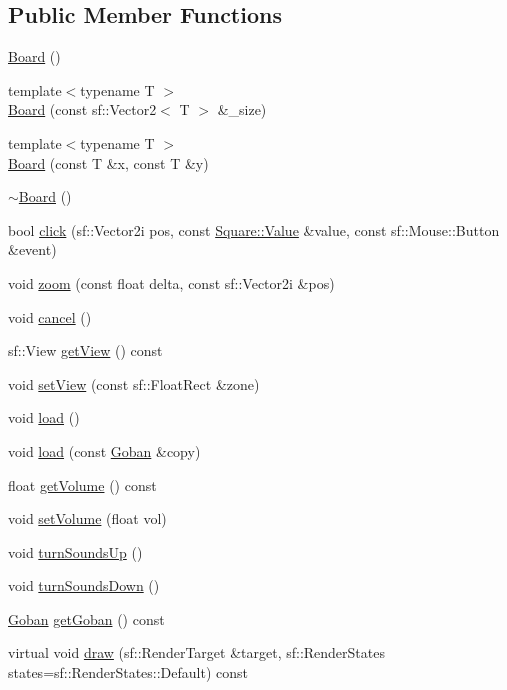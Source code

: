 \subsection*{Public Member Functions}
\begin{DoxyCompactItemize}
\item 
\hyperlink{class_board_a9ee491d4fea680cf69b033374a9fdfcb}{Board} ()
\item 
{\footnotesize template$<$typename T $>$ }\\\hyperlink{class_board_a3ab3bc5a15b6f8fb4aa8473fed2afdcb}{Board} (const sf\+::\+Vector2$<$ T $>$ \&\+\_\+size)
\item 
{\footnotesize template$<$typename T $>$ }\\\hyperlink{class_board_abda1ce2449776e76715fc7b59c912935}{Board} (const T \&x, const T \&y)
\item 
\hyperlink{class_board_af73f45730119a1fd8f6670f53f959e68}{$\sim$\+Board} ()
\item 
bool \hyperlink{class_board_a5fda73da080403d8a71a8593d581c350}{click} (sf\+::\+Vector2i pos, const \hyperlink{class_square_a7feeec236c037a9849114226adaa4ecc}{Square\+::\+Value} \&value, const sf\+::\+Mouse\+::\+Button \&event)
\item 
void \hyperlink{class_board_a0b098808fd9214c752097a623a7c717e}{zoom} (const float delta, const sf\+::\+Vector2i \&pos)
\item 
void \hyperlink{class_board_ac7ec911a62371650afd340d1535a1742}{cancel} ()
\item 
sf\+::\+View \hyperlink{class_board_ad3c413e185668418d3a16c1fec68e70d}{get\+View} () const
\item 
void \hyperlink{class_board_afb8c7e3266134506f024b29e08fef695}{set\+View} (const sf\+::\+Float\+Rect \&zone)
\item 
void \hyperlink{class_board_a841a248dac4743611ba1825afd5d1297}{load} ()
\item 
void \hyperlink{class_board_a3cea4df16e41c21666cf51789b7e9e78}{load} (const \hyperlink{class_goban}{Goban} \&copy)
\item 
float \hyperlink{class_board_a061962e73609a58802ad83674ec9b413}{get\+Volume} () const
\item 
void \hyperlink{class_board_a4450fe85fda29736cd835fed63d40a41}{set\+Volume} (float vol)
\item 
void \hyperlink{class_board_a77d145afa8d71a85c4097aca08c30525}{turn\+Sounds\+Up} ()
\item 
void \hyperlink{class_board_a648552cb139f9c0cc61f6372251739b2}{turn\+Sounds\+Down} ()
\item 
\hyperlink{class_goban}{Goban} \hyperlink{class_board_a19af96f42f5c38336010da2983abbf5c}{get\+Goban} () const
\item 
virtual void \hyperlink{class_board_a8c86104f9ff30a54cbd7520e006cd609}{draw} (sf\+::\+Render\+Target \&target, sf\+::\+Render\+States states=sf\+::\+Render\+States\+::\+Default) const
\end{DoxyCompactItemize}


